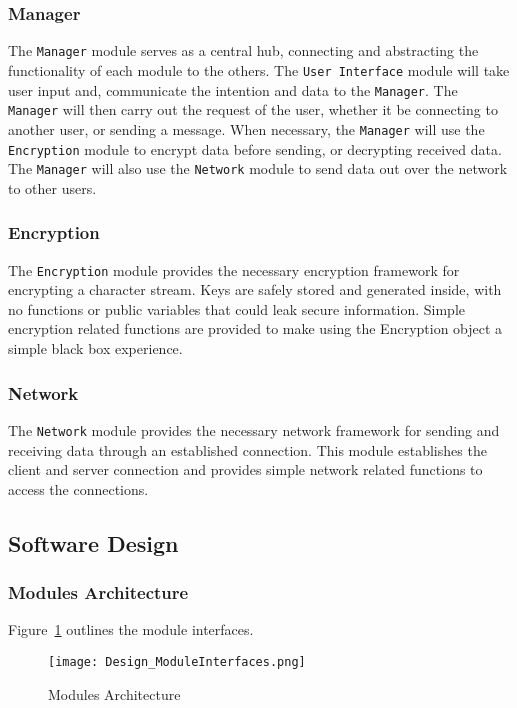 \documentclass[sigconf]{acmart}
\begin{document}
\subsubsection{Manager}
The \texttt{Manager} module serves as a central hub, connecting and abstracting the functionality
of each module to the others. The \texttt{User Interface} module will take user input and,
communicate the intention and data to the \texttt{Manager}. The \texttt{Manager} will then carry
out the request of the user, whether it be connecting to another user, or sending a message. When
necessary, the \texttt{Manager} will use the \texttt{Encryption} module to encrypt data before
sending, or decrypting received data. The \texttt{Manager} will also use the \texttt{Network}
module to send data out over the network to other users.

\subsubsection{Encryption}
The \texttt{Encryption} module provides the necessary encryption framework for encrypting a
character stream. Keys are safely stored and generated inside, with no functions or public
variables that could leak secure information. Simple encryption related functions are provided to
make using the Encryption object a simple black box experience.

\subsubsection{Network}
The \texttt{Network} module provides the necessary network framework for sending and receiving
data through an established connection. This module establishes the client and server
connection and provides simple network related functions to access the connections.

\subsection{Software Design}

\subsubsection{Modules Architecture}
Figure~\ref{Modules Architecture} outlines the module interfaces.
\begin{figure}[htb]
 \begin{center}
  \texttt{[image: Design\_ModuleInterfaces.png]}
  \caption{Modules Architecture}
  \label{Modules Architecture}
 \end{center}
\end{figure}
\end{document}
